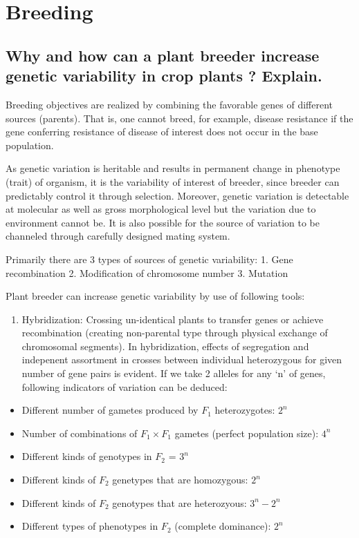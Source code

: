 \documentclass[
]{book}
\providecommand{\tightlist}{%
  \setlength{\itemsep}{0pt}\setlength{\parskip}{0pt}}
\begin{document}
\hypertarget{breeding}{%
\chapter{Breeding}\label{breeding}}

\hypertarget{why-and-how-can-a-plant-breeder-increase-genetic-variability-in-crop-plants-explain.}{%
\section{Why and how can a plant breeder increase genetic variability in crop plants ? Explain.}\label{why-and-how-can-a-plant-breeder-increase-genetic-variability-in-crop-plants-explain.}}

Breeding objectives are realized by combining the favorable genes of different sources (parents). That is, one cannot breed, for example, disease resistance if the gene conferring resistance of disease of interest does not occur in the base population.

As genetic variation is heritable and results in permanent change in phenotype (trait) of organism, it is the variability of interest of breeder, since breeder can predictably control it through selection. Moreover, genetic variation is detectable at molecular as well as gross morphological level but the variation due to environment cannot be. It is also possible for the source of variation to be channeled through carefully designed mating system.

Primarily there are 3 types of sources of genetic variability:
1. Gene recombination
2. Modification of chromosome number
3. Mutation

Plant breeder can increase genetic variability by use of following tools:

\begin{enumerate}
\def\labelenumi{\arabic{enumi}.}
\tightlist
\item
  Hybridization: Crossing un-identical plants to transfer genes or achieve recombination (creating non-parental type through physical exchange of chromosomal segments). In hybridization, effects of segregation and indepenent assortment in crosses between individual heterozygous for given number of gene pairs is evident. If we take 2 alleles for any `n' of genes, following indicators of variation can be deduced:
\end{enumerate}

\begin{itemize}
\tightlist
\item
  Different number of gametes produced by \(F_1\) heterozygotes: \(2^n\)
\item
  Number of combinations of \(F_1 \times F_1\) gametes (perfect population size): \(4^n\)
\item
  Different kinds of genotypes in \(F_2\) = \(3^n\)
\item
  Different kinds of \(F_2\) genetypes that are homozygous: \(2^n\)
\item
  Different kinds of \(F_2\) genotypes that are heterozyous: \(3^n-2^n\)
\item
  Different types of phenotypes in \(F_2\) (complete dominance): \(2^n\)
\end{itemize}
\end{document}
